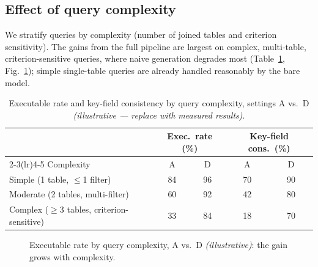 \documentclass[11pt]{article}
\begin{document}
\subsection{Effect of query complexity}
We stratify queries by complexity (number of joined tables and criterion sensitivity). The gains
from the full pipeline are largest on complex, multi-table, criterion-sensitive queries, where naive
generation degrades most (Table~\ref{tab:complexity}, Fig.~\ref{fig:complexity}); simple single-table
queries are already handled reasonably by the bare model.

\begin{table}[t]\centering
\caption{Executable rate and key-field consistency by query complexity, settings A vs.\ D
\textit{(illustrative --- replace with measured results)}.}\label{tab:complexity}
\begin{tabular}{lcccc}
\toprule
 & \multicolumn{2}{c}{Exec.\ rate (\%)} & \multicolumn{2}{c}{Key-field cons.\ (\%)}\\
\cmidrule(lr){2-3}\cmidrule(lr){4-5}
Complexity & A & D & A & D\\
\midrule
Simple (1 table, $\le$1 filter)              & 84 & 96 & 70 & 90\\
Moderate (2 tables, multi-filter)            & 60 & 92 & 42 & 80\\
Complex ($\ge$3 tables, criterion-sensitive) & 33 & 84 & 18 & 70\\
\bottomrule
\end{tabular}
\end{table}

\begin{figure}[t]\centering
{}
\caption{Executable rate by query complexity, A vs.\ D \textit{(illustrative)}: the gain grows with
complexity.}\label{fig:complexity}
\end{figure}
\end{document}
